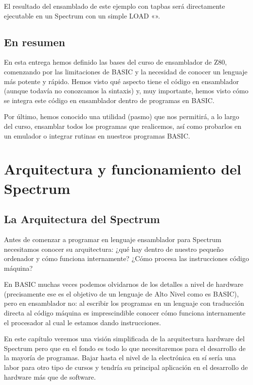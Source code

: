 \documentclass[letterpaper,10pt,spanish]{sphinxmanual}
\begin{document}
El resultado del ensamblado de este ejemplo con \textendash{}tapbas será directamente ejecutable en un Spectrum con un simple LOAD «».


\section{En resumen}
\label{\detokenize{02_introduccion/introduccion:en-resumen}}
En esta entrega hemos definido las bases del curso de ensamblador de Z80, comenzando por las limitaciones de BASIC y la necesidad de conocer un lenguaje más potente y rápido. Hemos visto qué aspecto tiene el código en ensamblador (aunque todavía no conozcamos la sintaxis) y, muy importante, hemos visto cómo se integra este código en ensamblador dentro de programas en BASIC.

Por último, hemos conocido una utilidad (pasmo) que nos permitirá, a lo largo del curso, ensamblar todos los programas que realicemos, así como probarlos en un emulador o integrar rutinas en nuestros programas BASIC.


\chapter{Arquitectura y funcionamiento del Spectrum}
\label{\detokenize{03_arquitectura/arquitectura:arquitectura-y-funcionamiento-del-spectrum}}\label{\detokenize{03_arquitectura/arquitectura::doc}}

\section{La Arquitectura del Spectrum}
\label{\detokenize{03_arquitectura/arquitectura:la-arquitectura-del-spectrum}}
Antes de comenzar a programar en lenguaje ensamblador para Spectrum necesitamos conocer su arquitectura: ¿qué hay dentro de nuestro pequeño ordenador y cómo funciona internamente? ¿Cómo procesa las instrucciones código máquina?

En BASIC muchas veces podemos olvidarnos de los detalles a nivel de hardware (precisamente ese es el objetivo de un lenguaje de Alto Nivel como es BASIC), pero en ensamblador no: al escribir los programas en un lenguaje con traducción directa al código máquina es imprescindible conocer cómo funciona internamente el procesador al cual le estamos dando instrucciones.

En este capítulo veremos una visión simplificada de la arquitectura hardware del Spectrum pero que en el fondo es todo lo que necesitaremos para el desarrollo de la mayoría de programas. Bajar hasta el nivel de la electrónica en sí sería una labor para otro tipo de cursos y tendría su principal aplicación en el desarrollo de hardware más que de software.
\end{document}
